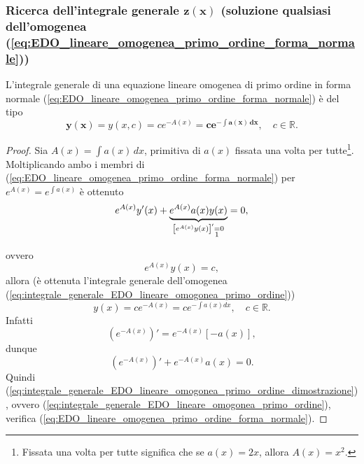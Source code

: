 \subsubsection{Ricerca dell'integrale generale \texorpdfstring{$\boldsymbol{z(x)}$}{z(x)} (soluzione qualsiasi dell'omogenea (\ref{eq:EDO_lineare_omogenea_primo_ordine_forma_normale}))}
\begin{theorem}
    L'integrale generale di una equazione lineare omogenea di primo ordine in forma normale (\ref{eq:EDO_lineare_omogenea_primo_ordine_forma_normale}) è del tipo
    \begin{equation}\label{eq:integrale_generale_EDO_lineare_omogonea_primo_ordine}
        \boldsymbol{y(x)=}y(x,c)=ce^{-A(x)}=\boldsymbol{ce^{-\int a(x)\, dx}},\quad c\in\mathbb R.
    \end{equation}
\end{theorem}

\begin{proof}
	Sia $A(x)=\int a(x)\, dx$, primitiva di $a(x)$ fissata una volta per tutte\footnote{Fissata una volta per tutte significa che se $a(x)=2x$, allora $A(x)=x^2$.}. Moltiplicando ambo i membri di (\ref{eq:EDO_lineare_omogenea_primo_ordine_forma_normale}) per $e^{A(x)}=e^{\int a(x)}$ è ottenuto
	\begin{equation*}
		e^{A(x)}y'(x)+\underbrace{e^{A(x)}a(x)y(x)}_{\left[e^{A(x)}y(x)\right]'\underset{\footnotemark}{=}0}=0,
	\end{equation*}
	ovvero
	\begin{equation}\label{eq:conseguenza_th_lagrange_edo}
		e^{A(x)}y(x)=c,
	\end{equation}
	allora (è ottenuta l'integrale generale dell'omogenea (\ref{eq:integrale_generale_EDO_lineare_omogonea_primo_ordine}))
	\begin{equation}\label{eq:integrale_generale_EDO_lineare_omogonea_primo_ordine_dimostrazione}
		y(x)=ce^{-A(x)} = c e^{-\int a(x) dx},\quad c\in\mathbb R.
	\end{equation}
	Infatti
	\begin{equation*}
		\left(e^{-A(x)}\right)'= e^{-A(x)}[-a(x)],
	\end{equation*}
	dunque
	\begin{equation*}
		\left(e^{-A(x)}\right)' + e^{-A(x)}a(x)=0.
	\end{equation*}
	Quindi (\ref{eq:integrale_generale_EDO_lineare_omogonea_primo_ordine_dimostrazione}), ovvero (\ref{eq:integrale_generale_EDO_lineare_omogonea_primo_ordine}), verifica (\ref{eq:EDO_lineare_omogenea_primo_ordine_forma_normale}).
\end{proof}

